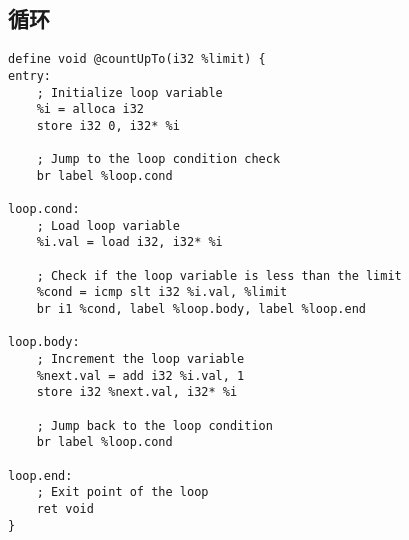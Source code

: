 \subsection{循环}
\begin{lstlisting}[language=none]
define void @countUpTo(i32 %limit) {
entry:
    ; Initialize loop variable
    %i = alloca i32
    store i32 0, i32* %i

    ; Jump to the loop condition check
    br label %loop.cond

loop.cond:
    ; Load loop variable
    %i.val = load i32, i32* %i

    ; Check if the loop variable is less than the limit
    %cond = icmp slt i32 %i.val, %limit
    br i1 %cond, label %loop.body, label %loop.end

loop.body:
    ; Increment the loop variable
    %next.val = add i32 %i.val, 1
    store i32 %next.val, i32* %i

    ; Jump back to the loop condition
    br label %loop.cond

loop.end:
    ; Exit point of the loop
    ret void
}
\end{lstlisting}
